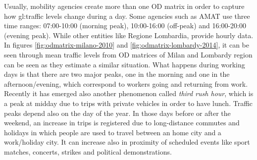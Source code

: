 Usually, mobility agencies create more than one OD matrix in order to capture how \gls{gl:traffic} levels change during a day.
Some agencies such as AMAT use three time ranges: 07:00-10:00 (morning peak), 10:00-16:00 (off-peak) and 16:00-20:00 (evening peak). 
While other entities like Regione Lombardia, provide hourly data.
In figures \ref{fig:odmatrix-milano-2010} and \ref{fig:odmatrix-lombardy-2014}, it can be seen through mean traffic levels from OD matrices of Milan and Lombardy region can be seen as they estimate a similar situation.
What happens during working days is that there are two major peaks, one in the morning and one in the afternoon/evening, which correspond to workers going and returning from work.
Recently it has emerged also another phenomenon called \textit{third rush hour}, which is a peak at midday due to trips with private vehicles in order to have lunch.
Traffic peaks depend also on the day of the year. In those days before or after the weekend, an increase in trips is registered due to long-distance commutes and holidays in which people are used to travel between an home city and a work/holiday city. It can increase also in proximity of scheduled events like sport matches, concerts, strikes and political demonstrations.

